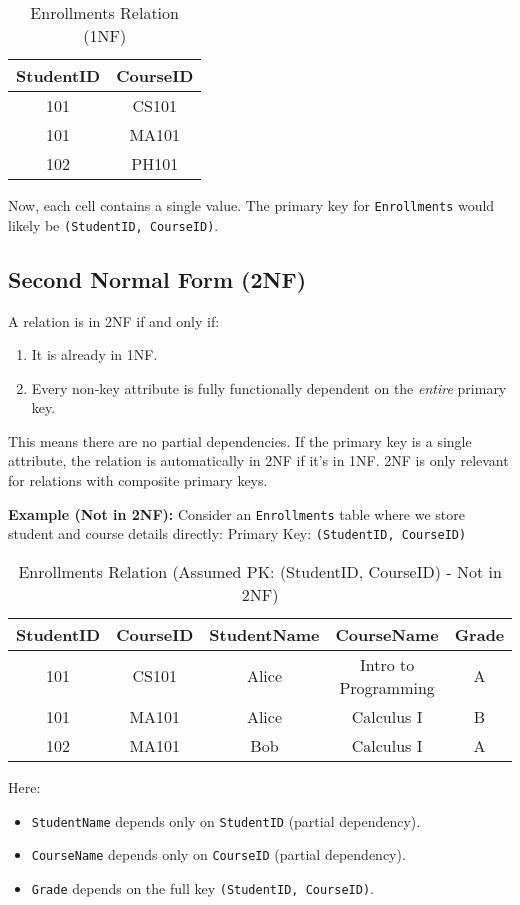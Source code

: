 \documentclass[12pt]{book}
\begin{document}
\begin{table}[htbp]
\centering
\begin{tabular}{@{}cc@{}}
\toprule
StudentID & CourseID \\
\midrule
101 & CS101 \\
101 & MA101 \\
102 & PH101 \\
\bottomrule
\end{tabular}
\caption{Enrollments Relation (1NF)}
\label{tab:enrollments_1nf}
\end{table}
Now, each cell contains a single value. The primary key for \texttt{Enrollments} would likely be \texttt{(StudentID, CourseID)}.

\subsection{Second Normal Form (2NF)}

A relation is in 2NF if and only if:
\begin{enumerate}
    \item It is already in 1NF.
    \item Every non-key attribute is fully functionally dependent on the \emph{entire} primary key.
\end{enumerate}

This means there are no partial dependencies. If the primary key is a single attribute, the relation is automatically in 2NF if it's in 1NF. 2NF is only relevant for relations with composite primary keys.

\textbf{Example (Not in 2NF):}
Consider an \texttt{Enrollments} table where we store student and course details directly:
Primary Key: \texttt{(StudentID, CourseID)}

\begin{table}[htbp]
\centering
\begin{tabular}{@{}ccccc@{}}
\toprule
StudentID & CourseID & StudentName & CourseName & Grade \\
\midrule
101 & CS101 & Alice & Intro to Programming & A \\
101 & MA101 & Alice & Calculus I & B \\
102 & MA101 & Bob & Calculus I & A \\
\bottomrule
\end{tabular}
\caption{Enrollments Relation (Assumed PK: (StudentID, CourseID) - Not in 2NF)}
\label{tab:not_2nf}
\end{table}

Here:
\begin{itemize}
    \item \texttt{StudentName} depends only on \texttt{StudentID} (partial dependency).
    \item \texttt{CourseName} depends only on \texttt{CourseID} (partial dependency).
    \item \texttt{Grade} depends on the full key \texttt{(StudentID, CourseID)}.
\end{itemize}
\end{document}
